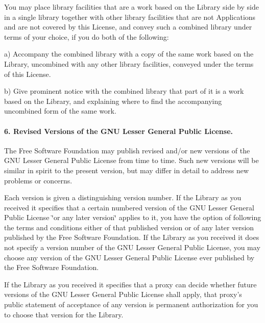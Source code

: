 You may place library facilities that are a work based on the Library side by side in a single library together with other library facilities that are not Applications and are not covered by this License, and convey such a combined library under terms of your choice, if you do both of the following\-:

a) Accompany the combined library with a copy of the same work based on the Library, uncombined with any other library facilities, conveyed under the terms of this License.

b) Give prominent notice with the combined library that part of it is a work based on the Library, and explaining where to find the accompanying uncombined form of the same work.

\paragraph*{6. Revised Versions of the G\-N\-U Lesser General Public License.}

The Free Software Foundation may publish revised and/or new versions of the G\-N\-U Lesser General Public License from time to time. Such new versions will be similar in spirit to the present version, but may differ in detail to address new problems or concerns.

Each version is given a distinguishing version number. If the Library as you received it specifies that a certain numbered version of the G\-N\-U Lesser General Public License \char`\"{}or any later version\char`\"{} applies to it, you have the option of following the terms and conditions either of that published version or of any later version published by the Free Software Foundation. If the Library as you received it does not specify a version number of the G\-N\-U Lesser General Public License, you may choose any version of the G\-N\-U Lesser General Public License ever published by the Free Software Foundation.

If the Library as you received it specifies that a proxy can decide whether future versions of the G\-N\-U Lesser General Public License shall apply, that proxy's public statement of acceptance of any version is permanent authorization for you to choose that version for the Library. 